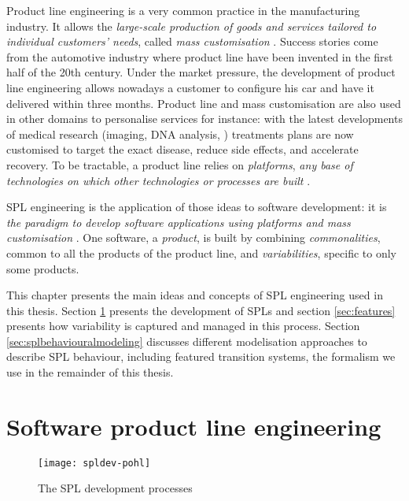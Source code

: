 
Product line engineering is a very common practice in the manufacturing industry. It allows the \textit{large-scale production of goods and services tailored to individual customers' needs}, called \emph{mass customisation} \cite{Pohl2005}. Success stories come from the automotive industry where product line have been invented in the first half of the 20th century. Under the market pressure, the development of product line engineering allows nowadays a customer to configure his car and have it delivered within three months. Product line and mass customisation are also used in other domains to personalise services for instance: with the latest developments of medical research (\eg imaging, DNA analysis, \etc) treatments plans are now customised to target the exact disease, reduce side effects, and accelerate recovery. To be tractable, a product line relies on \emph{platforms}, \ie \textit{any base of technologies on which other technologies or processes are built} \cite{Pohl2005}.


\gls{SPL} engineering is the application of those ideas to software development: it is \textit{the paradigm to develop software applications using platforms and mass customisation} \cite{Pohl2005}. One software, \ie a \emph{product}, is built by combining \emph{commonalities}, common to all the products of the product line, and \emph{variabilities}, specific to only some products. 

This chapter presents the main ideas and concepts of \gls{SPL} engineering used in this thesis. Section \ref{sec:sple} presents the development of \glspl{SPL} and section \ref{sec:features} presents how variability is captured and managed in this process. Section \ref{sec:splbehaviouralmodeling} discusses different modelisation approaches to describe \gls{SPL} behaviour, including featured transition systems, the formalism we use in the remainder of this thesis.


\section{Software product line engineering}

\label{sec:sple}

\begin{figure}
	\centering
	\texttt{[image: spldev-pohl]}
	\caption{The \gls{SPL} development processes \cite{Pohl2005}}
	\label{fig:spldev}
\end{figure}


